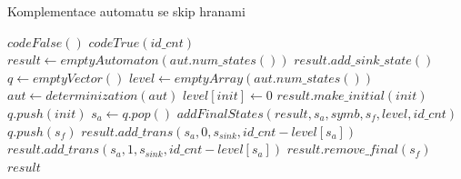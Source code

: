 \begin{algorithm}
    \caption{Komplementace automatu se skip hranami}
    \label{completement}
        \begin{algorithmic}[1]
                    \State \Return $codeFalse()$
                \EndIf
                    \State \Return $codeTrue(id\_cnt)$
                \EndIf
                \State $result \gets emptyAutomaton(aut.num\_states())$
                \State $result.add\_sink\_state()$
                \State $q \gets emptyVector()$
                \State $level \gets emptyArray(aut.num\_states())$
                \State $aut \gets determinization(aut)$ 
                    \State $level[init] \gets 0$
                    \State $result.make\_initial(init)$
                    \State $q.push(init)$
                \EndFor
                    \State $s_a \gets q.pop()$
                        \State $addFinalStates(result,s_a,symb,s_f,level,id\_cnt)$
                            \State $q.push(s_f)$
                        \EndIf
                    \EndFor
                        \State $result.add\_trans(s_a,0,s_{sink},id\_cnt-level[s_a])$
                    \EndIf
                        \State $result.add\_trans(s_a,1,s_{sink},id\_cnt-level[s_a])$
                    \EndIf
                \EndWhile
                    \State $result.remove\_final(s_f)$
                \EndFor
                \State \Return $result$
            \EndProcedure
        \end{algorithmic}
\end{algorithm}

